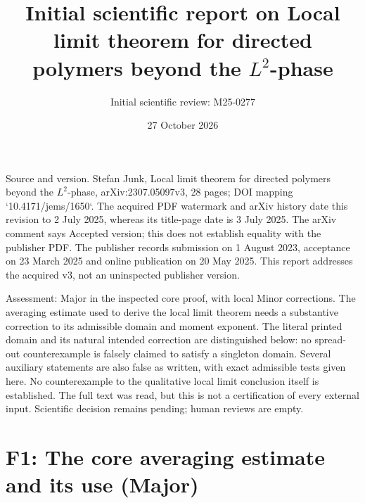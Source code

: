 \documentclass[10pt]{article}
\title{Initial scientific report on
Local limit theorem for directed polymers beyond the \(L^2\)-phase}
\author{Initial scientific review: M25-0277}
\date{27 October 2026}
\begin{document}
\maketitle
Source and version. Stefan Junk, Local limit theorem for directed polymers beyond the \(L^2\)-phase, arXiv:2307.05097v3, 28 pages; DOI mapping `10.4171/jems/1650`. The acquired PDF watermark and arXiv history date this revision to 2 July 2025, whereas its title-page date is 3 July 2025. The arXiv comment says Accepted version; this does not establish equality with the publisher PDF. The publisher records submission on 1 August 2023, acceptance on 23 March 2025 and online publication on 20 May 2025. This report addresses the acquired v3, not an uninspected publisher version.\par
Assessment: Major in the inspected core proof, with local Minor corrections. The averaging estimate used to derive the local limit theorem needs a substantive correction to its admissible domain and moment exponent. The literal printed domain and its natural intended correction are distinguished below: no spread-out counterexample is falsely claimed to satisfy a singleton domain. Several auxiliary statements are also false as written, with exact admissible tests given here. No counterexample to the qualitative local limit conclusion itself is established. The full text was read, but this is not a certification of every external input. Scientific decision remains pending; human reviews are empty.\par
\section*{F1: The core averaging estimate and its use (Major)}
\end{document}
